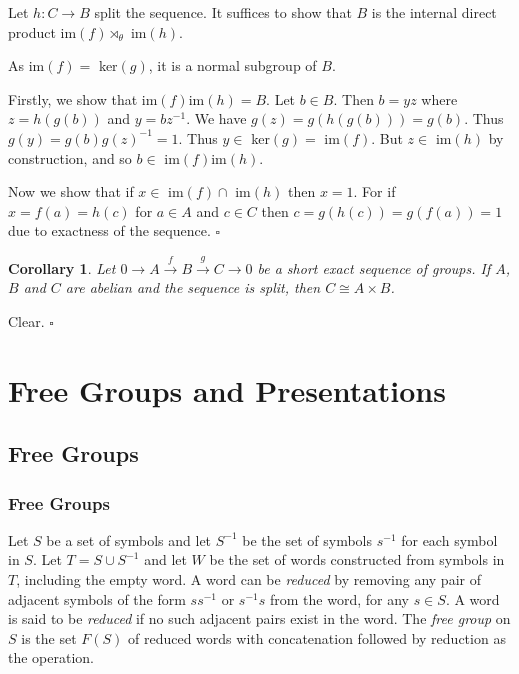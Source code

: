 \documentclass[10pt]{article}
\newtheorem{corollary}[theorem]{Corollary}
\newenvironment{proof}[1][Proof]{\begin{trivlist}
\item[\hskip \labelsep {\itshape #1}]}{\end{trivlist}}
\newenvironment{definition}[1][Definition]{\begin{trivlist}
\item[\hskip \labelsep {\bfseries #1}]}{\end{trivlist}}
\begin{document}
\begin{proof}
Let $h : C \to B$ split the sequence. It suffices to show that $B$ is the internal direct product im$(f)\rtimes_{\theta}$ im$(h)$.

As im$(f) =$ ker$(g)$, it is a normal subgroup of $B$.

Firstly, we show that im$(f)$im$(h) = B$. Let $b \in B$. Then $b = yz$ where $z = h(g(b))$ and $y = bz^{-1}$. We have $g(z) = g(h(g(b))) = g(b)$. Thus $g(y) = g(b)g(z)^{-1} = 1$. Thus $y \in$ ker$(g) =$ im$(f)$. But $z \in$ im$(h)$ by construction, and so $b \in$ im$(f)$im$(h)$.

Now we show that if $x \in$ im$(f)\cap$ im$(h)$ then $x = 1$. For if $x = f(a) = h(c)$ for $a \in A$ and $c \in C$ then $c = g(h(c)) = g(f(a)) = 1$ due to exactness of the sequence. $\square$
\end{proof}

\begin{corollary}
Let $0 \longrightarrow A \overset{f}{\longrightarrow} B \overset{g}{\longrightarrow} C \longrightarrow 0$ be a short exact sequence of groups. If $A$, $B$ and $C$ are abelian and the sequence is split, then $C \cong A\times B$.
\end{corollary}

\begin{proof}
Clear. $\square$
\end{proof}

\section{Free Groups and Presentations}

\subsection{Free Groups}

\subsubsection{Free Groups}

\begin{definition}
Let $S$ be a set of symbols and let $S^{-1}$ be the set of symbols $s^{-1}$ for each symbol in $S$. Let $T = S\cup S^{-1}$ and let $W$ be the set of words constructed from symbols in $T$, including the empty word. A word can be \emph{reduced} by removing any pair of adjacent symbols of the form $ss^{-1}$ or $s^{-1}s$ from the word, for any $s \in S$. A word is said to be \emph{reduced} if no such adjacent pairs exist in the word. The \emph{free group} on $S$ is the set $F(S)$ of reduced words with concatenation followed by reduction as the operation.
\end{definition}
\end{document}
